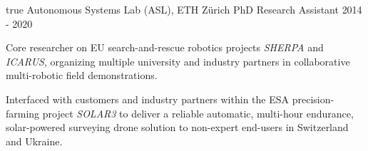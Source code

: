 \begin{cventries}
{\begin{cvitems}
      \end{cvitems}
    } %
    {} %
    {true}
    {}
%
\cvexpentry
  	{Autonomous Systems Lab (ASL), ETH Z\"{u}rich} %
  	{PhD Research Assistant} %
    {} %
    {2014 - 2020} %
    {
      \begin{cvitems} %
		\item Core researcher on EU search-and-rescue robotics projects \emph{SHERPA} and \emph{ICARUS}, organizing multiple university and industry partners in collaborative multi-robotic field demonstrations.
		\item Interfaced with customers and industry partners within the ESA precision-farming project \emph{SOLAR3} to deliver a reliable automatic, multi-hour endurance, solar-powered surveying drone solution to non-expert end-users in Switzerland and Ukraine.      	

\end{cvitems}}
\end{cventries}
